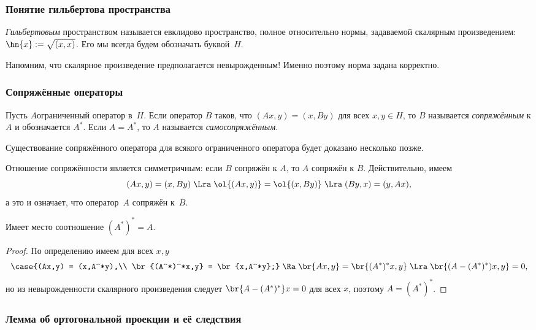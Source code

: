 \documentclass[a4paper]{article}
\begin{document}
\subsubsection{Понятие гильбертова пространства}

\begin{df}
\emph{Гильбертовым} пространством называется евклидово пространство, полное относительно нормы,
задаваемой скалярным произведением: $\hn{x} := \sqrt{(x,x)}$. Его мы всегда будем обозначать
буквой~$H$.
\end{df}

Напомним, что скалярное произведение предполагается невырожденным! Именно поэтому норма задана корректно.

\subsubsection{Сопряжённые операторы}

\begin{df}
Пусть $A$\т ограниченный оператор в~$H$.
Если оператор $B$ таков, что $(Ax,y) = (x,By)$ для всех $x,y\in H$, то $B$ называется \emph{сопряжённым} к $A$
и обозначается $A^*$. Если $A = A^*$, то $A$ называется \emph{самосопряжённым}.
\end{df}

\begin{note}
Существование сопряжённого оператора для всякого ограниченного оператора будет доказано несколько позже.
\end{note}

Отношение сопряжённости является симметричным: если $B$ сопряжён к $A$, то $A$ сопряжён к $B$.
Действительно, имеем
$$(Ax,y) = (x,By) \; \Lra \; \ol{(Ax,y)} = \ol{(x,By)} \; \Lra \; (By,x) = (y,Ax),$$
а это и означает, что оператор~$A$ сопряжён к~$B$.

\begin{stm}
Имеет место соотношение $(A^*)^* = A$.
\end{stm}
\begin{proof}
По определению имеем для всех $x,y$
$$\case{(Ax,y) = (x,A^*y),\\ \br{(A^*)^*x,y} = \br{x,A^*y};} \;\Ra \; \br{Ax,y} = \br{(A^*)^*x,y}
\; \Lra \; \br{(A-(A^*)^*)x, y} = 0,$$
но из невырожденности скалярного произведения следует $\br{A-(A^*)^*}x = 0$ для всех $x$,
поэтому $A = (A^*)^*$.
\end{proof}

\subsubsection{Лемма об ортогональной проекции и её следствия}
\end{document}
